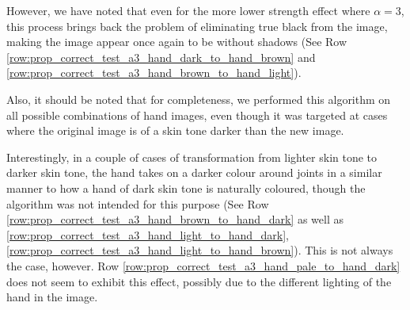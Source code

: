 However, we have noted that even for the more lower strength effect where $\alpha = 3$, this process brings back the problem of eliminating true black from the image, making the image appear once again to be without shadows (See Row \ref{row:prop_correct_test_a3_hand_dark_to_hand_brown} and \ref{row:prop_correct_test_a3_hand_brown_to_hand_light}). 

Also, it should be noted that for completeness, we performed this algorithm on all possible combinations of hand images, even though it was targeted at cases where the original image is of a skin tone darker than the new image. 

Interestingly, in a couple of cases of transformation from lighter skin tone to darker skin tone, the hand takes on a darker colour around joints in a similar manner to how a hand of dark skin tone is naturally coloured, though the algorithm was not intended for this purpose (See Row \ref{row:prop_correct_test_a3_hand_brown_to_hand_dark} as well as \ref{row:prop_correct_test_a3_hand_light_to_hand_dark}, \ref{row:prop_correct_test_a3_hand_light_to_hand_brown}). This is not always the case, however. Row \ref{row:prop_correct_test_a3_hand_pale_to_hand_dark} does not seem to exhibit this effect, possibly due to the different lighting of the hand in the image.